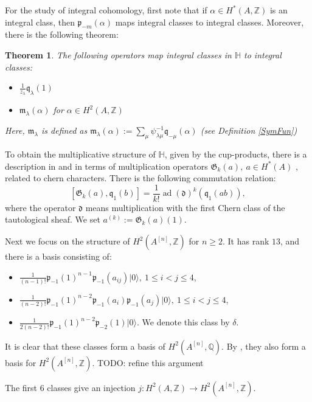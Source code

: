 \documentclass{amsart}
\DeclareMathOperator{\ad}{ad}
\newcommand{\hilb}[1]{^{[#1]}}
\newcommand{\vac}{|0\rangle}
\newcommand{\p}{\mathfrak{p}}
\renewcommand{\H}{\mathbb{H}}
\newcommand{\Q}{\mathbb{Q}}
\newcommand{\Z}{\mathbb{Z}}
\newcommand{\kq}{\mathfrak{q}}
\theoremstyle{plain}
\newtheorem{theorem}{Theorem}[section]
\theoremstyle{definition}
\theoremstyle{remark}
\begin{document}
For the study of integral cohomology, first note that if $\alpha \in H^*(A,\Z)$ is an integral class, then $\p_{-m}(\alpha) $ maps integral classes to integral classes. 
Moreover, there is the following theorem:
\begin{theorem} \cite{QinWang}
The following operators map integral classes in $\H$ to integral classes:
\begin{itemize}
\item $\frac{1}{z_\lambda}\kq_{\lambda}(1)$ 
\item $\mathfrak{m}_{\lambda}(\alpha)$ for $\alpha \in H^2(A,\Z)$ 
\end{itemize}
Here, $\mathfrak{m}_{\lambda}$ is defined as $\mathfrak{m}_{\lambda}(\alpha):=\sum_{\mu} \psi^{-1}_{\lambda\mu} \kq_{-\mu}(\alpha) $ (see Definition \ref{SymFun})
\end{theorem}

To obtain the multiplicative structure of $\H$, given by the cup-products, there is a description in \cite{LehnSorger} and \cite{LiQinWang} in terms of multiplication operators $\mathfrak{G}_k(a),\ a\in H^*(A)$ \cite[Def.~5.1]{LiQinWang}, related to chern characters. There is the following commutation relation: 
$$
[\mathfrak{G}_k(a),\kq_1(b)] = \frac{1}{k!}\ad(\mathfrak{d})^k(\kq_1(ab)),
$$
where the operator $\mathfrak{d}$ means multiplication with the first Chern class of the tautological sheaf.
We set $a^{(k)} := \mathfrak{G}_k(a) (1)$.

Next we focus on the structure of $H^2(A\hilb{n},\Z)$ for $n\geq 2$. It has rank $13$, and there is a basis consisting of:
\begin{itemize}
 \item $\frac{1}{(n-1)!}\p_{-1}(1)^{n-1}\p_{-1}(a_{ij})\vac,\ 1\leq i < j\leq 4$,
 \item $\frac{1}{(n-2)!}\p_{-1}(1)^{n-2}\p_{-1}(a_{i})\p_{-1}(a_{j})\vac,\ 1\leq i < j\leq 4$,
 \item $\frac{1}{2(n-2)!}\p_{-1}(1)^{n-2}\p_{-2}(1) \vac$. We denote this class by $\delta$.
\end{itemize}
It is clear that these classes form a basis of $H^2(A\hilb{n},\Q)$. By \cite[Thm.~4.6,Lemma~5.2]{QinWang}, they also form a basis for $H^2(A\hilb{n},\Z)$. TODO: refine this argument

The first $6$ classes give an injection $j : H^2(A,\Z)\rightarrow H^2(A\hilb{n},\Z)$. 
\end{document}
